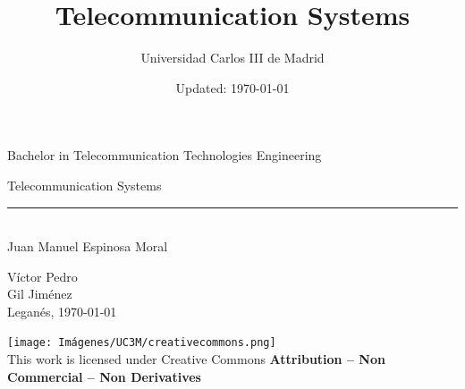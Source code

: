 \documentclass[
	12pt,
	twoside
]{book}
\title{Telecommunication Systems}
\author{Universidad Carlos III de Madrid}
\date{Updated: \today}
\begin{document}
\begin{titlepage}
	\begin{sffamily}
	\color{azulUC3M}

	\begin{center}

		\begin{figure}[H]
		\end{figure}

		\vspace{2.5cm}

		\begin{Large}
			Bachelor in Telecommunication Technologies Engineering\\			
			\bigskip
		\end{Large}

		 	{\Huge Telecommunication Systems}\\
		 	\vspace*{0.5cm}
	 		\rule{10.5cm}{0.1mm}\\
			\vspace*{0.9cm}
			{\LARGE Juan Manuel Espinosa Moral}\\ 
			\vspace*{1cm}

		\begin{Large}
			Víctor Pedro\\
			Gil Jiménez\\
			Leganés, \today\\
		\end{Large}
	\end{center}

	\vfill

	\color{black}

	\texttt{[image: Imágenes/UC3M/creativecommons.png]}\\
	This work is licensed under Creative Commons \textbf{Attribution – Non Commercial – Non Derivatives}

	\end{sffamily}
\end{titlepage}

\newpage

\end{document}
